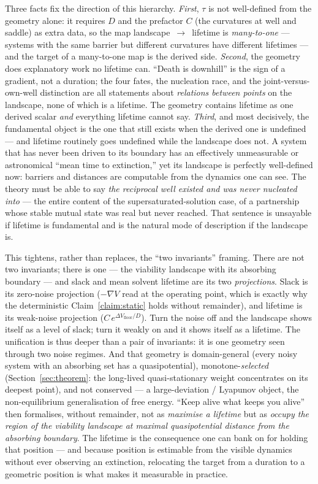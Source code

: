 \documentclass[11pt]{article}
\theoremstyle{plain}
\theoremstyle{definition}
\begin{document}
Three facts fix the direction of this hierarchy. \emph{First}, $\tau$ is not well-defined from the geometry alone: it requires $D$ and the prefactor $C$ (the curvatures at well and saddle) as extra data, so the map landscape~$\to$~lifetime is \emph{many-to-one} --- systems with the same barrier but different curvatures have different lifetimes --- and the target of a many-to-one map is the derived side. \emph{Second}, the geometry does explanatory work no lifetime can. ``Death is downhill'' is the sign of a gradient, not a duration; the four fates, the nucleation race, and the joint-versus-own-well distinction are all statements about \emph{relations between points} on the landscape, none of which is a lifetime. The geometry contains lifetime as one derived scalar \emph{and} everything lifetime cannot say. \emph{Third}, and most decisively, the fundamental object is the one that still exists when the derived one is undefined --- and lifetime routinely goes undefined while the landscape does not. A system that has never been driven to its boundary has an effectively unmeasurable or astronomical ``mean time to extinction,'' yet its landscape is perfectly well-defined now: barriers and distances are computable from the dynamics one can see. The theory must be able to say \emph{the reciprocal well existed and was never nucleated into} --- the entire content of the supersaturated-solution case, of a partnership whose stable mutual state was real but never reached. That sentence is unsayable if lifetime is fundamental and is the natural mode of description if the landscape is.

This tightens, rather than replaces, the ``two invariants'' framing. There are not two invariants; there is one --- the viability landscape with its absorbing boundary --- and slack and mean solvent lifetime are its two \emph{projections}. Slack is its zero-noise projection ($-\nabla V$ read at the operating point, which is exactly why the deterministic Claim~\ref{claim:static} holds without remainder), and lifetime is its weak-noise projection ($C\,e^{\Delta V_{\text{floor}}/D}$). Turn the noise off and the landscape shows itself as a level of slack; turn it weakly on and it shows itself as a lifetime. The unification is thus deeper than a pair of invariants: it is one geometry seen through two noise regimes. And that geometry is domain-general (every noisy system with an absorbing set has a quasipotential), monotone-\emph{selected} (Section~\ref{sec:theorem}: the long-lived quasi-stationary weight concentrates on its deepest point), and not conserved --- a large-deviation / Lyapunov object, the non-equilibrium generalisation of free energy. ``Keep alive what keeps you alive'' then formalises, without remainder, not as \emph{maximise a lifetime} but as \emph{occupy the region of the viability landscape at maximal quasipotential distance from the absorbing boundary}. The lifetime is the consequence one can bank on for holding that position --- and because position is estimable from the visible dynamics without ever observing an extinction, relocating the target from a duration to a geometric position is what makes it measurable in practice.
\end{document}
